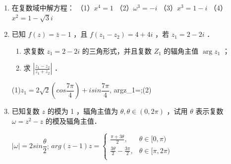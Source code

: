 \begin{enumerate}
\begin{enumerate}[(1)]
\item $3\left(\cos\ang{18}+\mi\sin\ang{18}\right)\times 2\left(\cos\ang{54}+\mi\sin\ang{54}\right)\times 5\left(\cos\ang{108}+\mi\sin\ang{108}\right)=$. 

\item $\sqrt{3}\left(\cos\ang{150}+\mi\sin\ang{150}\right)\div\left[\sqrt{2}\left(\cos\ang{300}+\mi\sin\ang{300}\right)\right]=$. 

\item $\left(\cos\dfrac{\pi}{4}-\mi\sin\dfrac{\pi}{4}\right)^3=$. 

\item $1\div\left(\cos\dfrac{\pi}{4}+\mi\sin\dfrac{\pi}{4}\right)=$. 
\end{enumerate}



\item 在复数域中解方程：
（1）$x^4=1$
（2）$\omega^3=-i$
（3）$x^3=1-i$
（4）$x^2=1-\sqrt{3} i$


\item 已知 $f(z)=\bar{z}-1$ ，且 $f\left(z_1-z_2\right)=4+4 i$ ，若 $z_1=2-2 i$ ．
\begin{enumerate}
    \item 求复数 $z_1=2-2 i$ 的三角形式，并且复数 $Z_1$ 的辐角主值 $\arg z_1$ ；
    \item 求 $\left|\frac{z_1-z_2}{z_1+z_2}\right|$ ．
\end{enumerate}

\begin{jieda}
    (1)$z_1=2\sqrt{2}(cos\dfrac{7\pi}{4})+isin\dfrac{7\pi}{4}$, argz_1=;(2)
\end{jieda}



\item 已知复数 $z$ 的模为 1 ，辐角主值为 $\theta, \theta \in(0,2 \pi)$ ，试用 $\theta$ 表示复数 $\omega=z^2-z$ 的模及辐角主值．

\begin{jieda}
    $|\omega|=2sin\dfrac{\theta}{2}$;
    $arg(z-1)z = \left \{ \begin{array}{ll}
                     \frac{\pi+3\theta}{2}, &  \theta\in [0,\pi) \\
                     \frac{3\theta}{2}-\frac{3\pi}{2}, & \theta\in [\pi, 2\pi) \\
                \end{array} \right.$
\end{jieda}


\end{enumerate}
